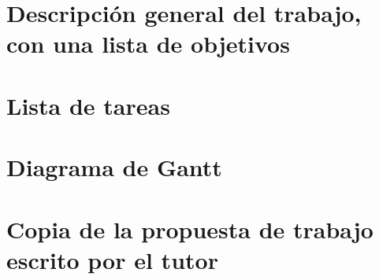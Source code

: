 \documentclass[11pt]{article}
\begin{document}
\maketitle
\tableofcontents
\newpage

\section{Descripción general del trabajo, con una lista de objetivos}
\section{Lista de tareas}
\section{Diagrama de Gantt}
\section{Copia de la propuesta de trabajo escrito por el tutor}
\end{document}
